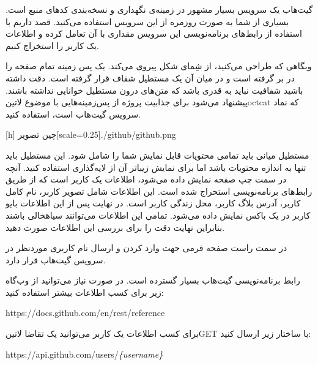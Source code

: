 

گیت‌هاب یک سرویس بسیار مشهور در زمینه‌ی نگهداری و نسخه‌بندی کدهای منبع است. بسیاری از شما به صورت روزمره از این سرویس استفاده می‌کنید.
قصد داریم با استفاده از رابط‌های برنامه‌نویسی این سرویس مقداری با آن تعامل کرده و اطلاعات یک کاربر را استخراج کنیم.


وبگاهی که طراحی می‌کنید، از شِمای شکل  پیروی می‌کند. یک پس زمینه تمام صفحه را در بر گرفته است و در میان آن یک مستطیل شفاف قرار گرفته است.
دقت داشته باشید شفافیت نباید به قدری باشد که متن‌های درون مستطیل خوانایی نداشته باشند.
پیشنهاد می‌شود برای جذابیت پروژه از پس‌زمینه‌هایی با موضوع ‌لاتین{octcat} که نماد سرویس گیت‌هاب است، استفاده کنید.

[h]
   ‌چین
  ‌تصویر[scale=0.25]{./github/github.png}

مستطیل میانی باید تمامی محتویات قابل نمایش شما را شامل شود. این مستطیل باید تنها به اندازه محتویات باشد اما برای نمایش زیباتر آن از لایه‌گذاری استفاده کنید.
آنچه در سمت چپ صفحه نمایش داده می‌شود، اطلاعات یک کاربر است که از طریق رابط‌های برنامه‌نویسی استخراج شده است. این اطلاعات شامل تصویر کاربر،
نام کامل کاربر، آدرس بلاگ کاربر، محل زندگی کاربر است.
در نهایت پس از این اطلاعات بایو کاربر در یک باکس نمایش داده می‌شود.
تمامی این اطلاعات می‌توانند ‌سیاه{خالی} باشند بنابراین نهایت دقت را برای بررسی این اطلاعات صورت دهید.

در سمت راست صفحه فرمی جهت وارد کردن و ارسال نام کاربری موردنظر در سرویس گیت‌هاب قرار دارد.

رابط برنامه‌نویسی گیت‌هاب بسیار گسترده است. در صورت نیاز می‌توانید از وب‌گاه زیر برای کسب اطلاعات بیشتر استفاده کنید:

\begin{latin}\begin{center}
https://docs.github.com/en/rest/reference
\end{center}\end{latin}

برای کسب اطلاعات یک کاربر می‌توانید یک تقاضا ‌لاتین{GET} با ساختار زیر ارسال کنید:

\begin{latin}\begin{center}
https://api.github.com/users/\textit{\{username\}}
\end{center}\end{latin}

